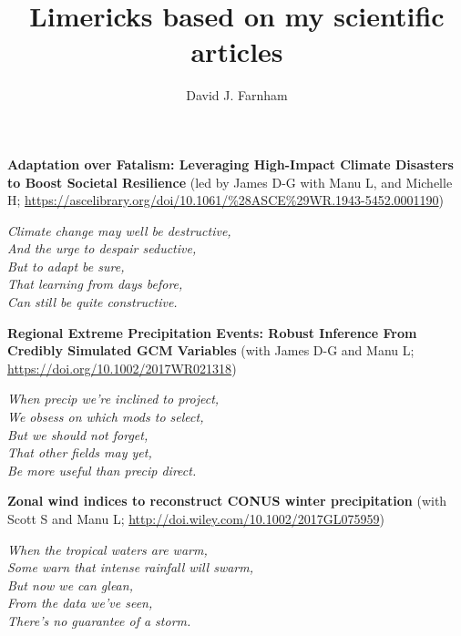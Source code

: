\documentclass{article}
\title{
Limericks based on my scientific articles
}
\author{David J. Farnham}
\begin{document}
\maketitle

\noindent
\textbf{Adaptation over Fatalism: Leveraging High-Impact Climate Disasters to Boost Societal Resilience} (led by James D-G with Manu L, and Michelle H; \url{https://ascelibrary.org/doi/10.1061/%28ASCE%29WR.1943-5452.0001190})\\

\vspace{0.25cm}

{\large
\noindent
\textit{Climate change may well be destructive,\\
And the urge to despair seductive,\\
\null \hspace{0.5cm} But to adapt be sure,\\
\null \hspace{0.5cm} That learning from days before,\\
Can still be quite constructive.}
}

\vspace{1.0cm}


\noindent
\textbf{Regional Extreme Precipitation Events: Robust Inference From Credibly Simulated GCM Variables} (with James D-G and Manu L; \url{https://doi.org/10.1002/2017WR021318})\\

\vspace{0.25cm}

{\large
\noindent
\textit{When precip we're inclined to project,\\
We obsess on which mods to select,\\
\null \hspace{0.5cm} But we should not forget,\\
\null \hspace{0.5cm} That other fields may yet,\\
Be more useful than precip direct.}
}

\vspace{1.0cm}


\noindent
\textbf{Zonal wind indices to reconstruct CONUS winter precipitation} (with Scott S and Manu L; \url{http://doi.wiley.com/10.1002/2017GL075959})\\

\vspace{0.25cm}

{\large
\noindent
\textit{When the tropical waters are warm,\\
Some warn that intense rainfall will swarm,\\
\null \hspace{0.5cm} But now we can glean,\\
\null \hspace{0.5cm} From the data we've seen,\\
There's no guarantee of a storm.}
}
\end{document}
